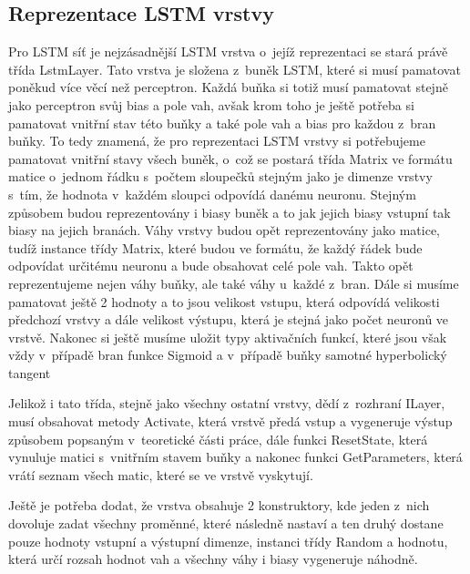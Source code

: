 \documentclass[a4paper]{article}
\begin{document}
\subsection{Reprezentace LSTM vrstvy}
Pro LSTM síť je nejzásadnější LSTM vrstva o~jejíž reprezentaci se stará právě třída LstmLayer. Tato vrstva je složena z~buněk LSTM, které si musí pamatovat poněkud více věcí než perceptron. Každá buňka si totiž musí pamatovat stejně jako perceptron svůj bias a pole vah, avšak krom toho je ještě potřeba si pamatovat vnitřní stav této buňky a také pole vah a bias pro každou z~bran buňky. To tedy znamená, že pro reprezentaci LSTM vrstvy si potřebujeme pamatovat vnitřní stavy všech buněk, o~což se postará třída Matrix ve formátu matice o~jednom řádku s~počtem sloupečků stejným jako je dimenze vrstvy s~tím, že hodnota v~každém sloupci odpovídá danému neuronu. Stejným způsobem budou reprezentovány i biasy buněk a to jak jejich biasy vstupní tak biasy na jejich branách. Váhy vrstvy budou opět reprezentovány jako matice, tudíž instance třídy Matrix, které budou ve formátu, že každý řádek bude odpovídat určitému neuronu a bude obsahovat celé pole vah. Takto opět reprezentujeme nejen váhy buňky, ale také váhy u~každé z~bran. Dále si musíme pamatovat ještě 2 hodnoty a to jsou velikost vstupu, která odpovídá velikosti předchozí vrstvy a dále velikost výstupu, která je stejná jako počet neuronů ve vrstvě. Nakonec si ještě musíme uložit typy aktivačních funkcí, které jsou však vždy v~případě bran funkce Sigmoid a v~případě buňky samotné hyperbolický tangent\par
Jelikož i tato třída, stejně jako všechny ostatní vrstvy, dědí z~rozhraní ILayer, musí obsahovat metody Activate, která vrstvě předá vstup a vygeneruje výstup způsobem popsaným v~teoretické části práce, dále funkci ResetState, která vynuluje matici s~vnitřním stavem buňky a nakonec funkci GetParameters, která vrátí seznam všech matic, které se ve vrstvě vyskytují.\par
Ještě je potřeba dodat, že vrstva obsahuje 2 konstruktory, kde jeden z~nich dovoluje zadat všechny proměnné, které následně nastaví a ten druhý dostane pouze hodnoty vstupní a výstupní dimenze, instanci třídy Random a hodnotu, která určí rozsah hodnot vah a všechny váhy i biasy vygeneruje náhodně.
\end{document}
